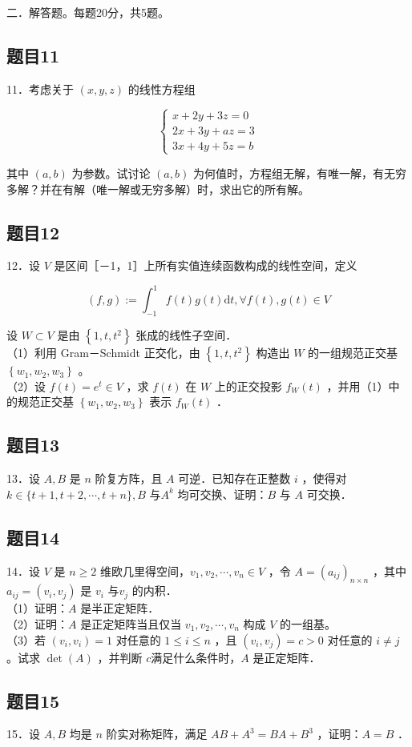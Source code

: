 \documentclass{article}
\begin{document}
二．解答题。每题20分，共5题。\\

\subsection{题目11}
11．考虑关于 \((x, y, z)\) 的线性方程组

\[
\left\{\begin{array}{l}
x+2 y+3 z=0 \\
2 x+3 y+a z=3 \\
3 x+4 y+5 z=b
\end{array}\right.
\]

其中 \((a, b)\) 为参数。试讨论 \((a, b)\) 为何值时，方程组无解，有唯一解，有无穷多解？并在有解（唯一解或无穷多解）时，求出它的所有解。

\subsection{题目12}
12．设 \(V\) 是区间［－1，1］上所有实值连续函数构成的线性空间，定义

\[
(f, g):=\int_{-1}^{1} f(t) g(t) \mathrm{d} t, \forall f(t), g(t) \in V
\]

设 \(W \subset V\) 是由 \(\left\{1, t, t^{2}\right\}\) 张成的线性子空间．\\
（1）利用 Gram－Schmidt 正交化，由 \(\left\{1, t, t^{2}\right\}\) 构造出 \(W\) 的一组规范正交基 \(\left\{w_{1}, w_{2}, w_{3}\right\}\) 。\\
（2）设 \(f(t)=e^{t} \in V\) ，求 \(f(t)\) 在 \(W\) 上的正交投影 \(f_{W}(t)\) ，并用（1）中的规范正交基 \(\left\{w_{1}, w_{2}, w_{3}\right\}\) 表示 \(f_{W}(t)\) ．

\subsection{题目13}
13．设 \(A, B\) 是 \(n\) 阶复方阵，且 \(A\) 可逆．已知存在正整数 \(i\) ，使得对 \(k \in\{t+1, t+2, \cdots, t+n\}, B\) 与\(A^{k}\) 均可交换、证明：\(B\) 与 \(A\) 可交换．

\subsection{题目14}
14．设 \(V\) 是 \(n \geq 2\) 维欧几里得空间，\(v_{1}, v_{2}, \cdots, v_{n} \in V\) ，令 \(A=\left(a_{i j}\right)_{n \times n}\) ，其中 \(a_{i j}=\left(v_{i}, v_{j}\right)\) 是 \(v_{i}\) 与\(v_{j}\) 的内积．\\
（1）证明：\(A\) 是半正定矩阵．\\
（2）证明：\(A\) 是正定矩阵当且仅当 \(v_{1}, v_{2}, \cdots, v_{n}\) 构成 \(V\) 的一组基。\\
（3）若 \(\left(v_{i}, v_{i}\right)=1\) 对任意的 \(1 \leq i \leq n\) ，且 \(\left(v_{i}, v_{j}\right)=c>0\) 对任意的 \(i \neq j\) 。试求 \(\operatorname{det}(A)\) ，并判断 \(c\)满足什么条件时，\(A\) 是正定矩阵．

\subsection{题目15}
15．设 \(A, B\) 均是 \(n\) 阶实对称矩阵，满足 \(A B+A^{3}=B A+B^{3}\) ，证明：\(A=B\) ．
\end{document}
